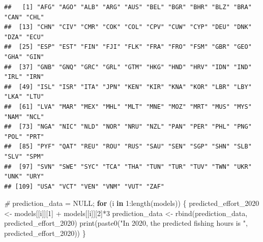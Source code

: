 \documentclass[
]{article}
\newenvironment{Shaded}{\begin{snugshade}}{\end{snugshade}}
\newcommand{\CommentTok}[1]{\textcolor[rgb]{0.56,0.35,0.01}{\textit{#1}}}
\newcommand{\ConstantTok}[1]{\textcolor[rgb]{0.00,0.00,0.00}{#1}}
\newcommand{\ControlFlowTok}[1]{\textcolor[rgb]{0.13,0.29,0.53}{\textbf{#1}}}
\newcommand{\DecValTok}[1]{\textcolor[rgb]{0.00,0.00,0.81}{#1}}
\newcommand{\FunctionTok}[1]{\textcolor[rgb]{0.00,0.00,0.00}{#1}}
\newcommand{\NormalTok}[1]{#1}
\newcommand{\OtherTok}[1]{\textcolor[rgb]{0.56,0.35,0.01}{#1}}
\newcommand{\SpecialCharTok}[1]{\textcolor[rgb]{0.00,0.00,0.00}{#1}}
\newcommand{\StringTok}[1]{\textcolor[rgb]{0.31,0.60,0.02}{#1}}
\begin{document}
\begin{Shaded}
\end{Shaded}

\begin{verbatim}
##   [1] "AFG" "AGO" "ALB" "ARG" "AUS" "BEL" "BGR" "BHR" "BLZ" "BRA" "CAN" "CHL"
##  [13] "CHN" "CIV" "CMR" "COK" "COL" "CPV" "CUW" "CYP" "DEU" "DNK" "DZA" "ECU"
##  [25] "ESP" "EST" "FIN" "FJI" "FLK" "FRA" "FRO" "FSM" "GBR" "GEO" "GHA" "GIN"
##  [37] "GNB" "GNQ" "GRC" "GRL" "GTM" "HKG" "HND" "HRV" "IDN" "IND" "IRL" "IRN"
##  [49] "ISL" "ISR" "ITA" "JPN" "KEN" "KIR" "KNA" "KOR" "LBR" "LBY" "LKA" "LTU"
##  [61] "LVA" "MAR" "MEX" "MHL" "MLT" "MNE" "MOZ" "MRT" "MUS" "MYS" "NAM" "NCL"
##  [73] "NGA" "NIC" "NLD" "NOR" "NRU" "NZL" "PAN" "PER" "PHL" "PNG" "POL" "PRT"
##  [85] "PYF" "QAT" "REU" "ROU" "RUS" "SAU" "SEN" "SGP" "SHN" "SLB" "SLV" "SPM"
##  [97] "SVN" "SWE" "SYC" "TCA" "THA" "TUN" "TUR" "TUV" "TWN" "UKR" "UNK" "URY"
## [109] "USA" "VCT" "VEN" "VNM" "VUT" "ZAF"
\end{verbatim}

\begin{Shaded}
\begin{Highlighting}[]
\CommentTok{\# }
\NormalTok{prediction\_data }\OtherTok{=} \ConstantTok{NULL}\NormalTok{;}
\ControlFlowTok{for}\NormalTok{ (i }\ControlFlowTok{in} \DecValTok{1}\SpecialCharTok{:}\FunctionTok{length}\NormalTok{(models)) \{}
\NormalTok{  predicted\_effort\_2020 }\OtherTok{\textless{}{-}}\NormalTok{ models[[i]][}\DecValTok{1}\NormalTok{] }\SpecialCharTok{+}\NormalTok{ models[[i]][}\DecValTok{2}\NormalTok{]}\SpecialCharTok{*}\DecValTok{3}
\NormalTok{  prediction\_data }\OtherTok{\textless{}{-}} \FunctionTok{rbind}\NormalTok{(prediction\_data, predicted\_effort\_2020)}
  \FunctionTok{print}\NormalTok{(}\FunctionTok{paste0}\NormalTok{(}\StringTok{"In 2020, the predicted fishing hours is "}\NormalTok{, predicted\_effort\_2020))}
\NormalTok{\}}
\end{Highlighting}
\end{Shaded}
\end{document}
